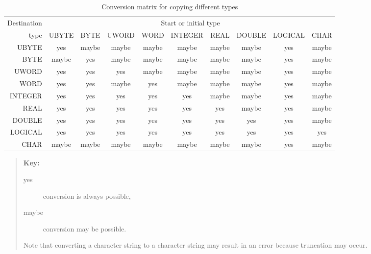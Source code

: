 \documentclass[11pt,twoside]{starlink}
\begin{document}
\begin{table}[htbp]

\begin{center}
{\footnotesize
\begin{tabular}{r|ccccccccc}
Destination &\multicolumn{9}{c}{Start or initial type} \\
type    & UBYTE & BYTE  & UWORD & WORD  & INTEGER & REAL  & DOUBLE & LOGICAL & CHAR   \\ \hline
UBYTE   &  yes  & maybe & maybe & maybe & maybe   & maybe & maybe  &   yes   & maybe  \\
BYTE    & maybe &  yes  & maybe & maybe & maybe   & maybe & maybe  &   yes   & maybe  \\
UWORD   &  yes  &  yes  &  yes  & maybe & maybe   & maybe & maybe  &   yes   & maybe  \\
WORD    &  yes  &  yes  & maybe &  yes  & maybe   & maybe & maybe  &   yes   & maybe  \\
INTEGER &  yes  &  yes  &  yes  &  yes  &  yes    & maybe & maybe  &   yes   & maybe  \\
REAL    &  yes  &  yes  &  yes  &  yes  &  yes    &  yes  & maybe  &   yes   & maybe  \\
DOUBLE  &  yes  &  yes  &  yes  &  yes  &  yes    &  yes  &  yes   &   yes   & maybe  \\
LOGICAL &  yes  &  yes  &  yes  &  yes  &  yes    &  yes  &  yes   &   yes   &  yes   \\
CHAR    & maybe & maybe & maybe & maybe & maybe   & maybe & maybe  &   yes   & maybe  \\
\end{tabular}  }
\end{center}

\begin{quote}
\textbf{Key:}

\begin{description}

  \item[yes] conversion is always possible,

  \item[maybe] conversion may be possible.


\end{description}

Note that converting a character string to a character string may result
in an error because truncation may occur.
\end{quote}

\caption{\label{CONVMAT}Conversion matrix for copying different types}

\end{table}
\end{document}
